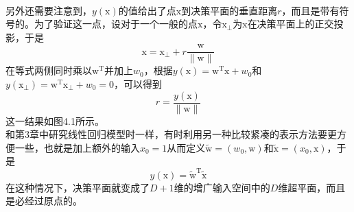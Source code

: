 \documentclass[b5paper]{book}
\numberwithin{equation}{chapter}
\newcommand {\bx} {\boldsymbol{\mathrm{x}}}
\newcommand {\bw} {\boldsymbol{\mathrm{w}}}
\newcommand {\rmT} {\mathrm{T}}
\begin{document}
{\begin{figure}[ht]
		\label{fig:4-1}
	\end{figure}
	\\
	\indent 另外还需要注意到，$y(\bx)$的值给出了点$\bx$到决策平面的垂直距离$r$，而且是带有符号的。为了验证这一点，设对于一个一般的点$\bx$，令$\bx_\bot$为$\bx$在决策平面上的正交投影，于是
	\begin{equation}
		\bx = \bx_\bot + r \frac{\bw}{\|\bw\|}
	\end{equation}
	在等式两侧同时乘以$\bw^{\rmT}$并加上$w_0$，根据$y(\bx)=\bw^{\rmT}\bx+w_0$和$y(\bx_\bot)=\bw^{\rmT}\bx_\bot + w_0 = 0$，可以得到
	\begin{equation}
		r = \frac{y(\bx)}{\|\bw\|}
	\end{equation}
	这一结果如图4.1所示。\\
	\indent 和第3章中研究线性回归模型时一样，有时利用另一种比较紧凑的表示方法要更方便一些，也就是加上额外的输入$x_0 = 1$从而定义$\widetilde{\bw} = (w_0,\bw)$和$\widetilde{\bx} = (x_0, \bx)$，于是
	\begin{equation}
		y(\bx) = \widetilde{\bw}^{\rmT} \widetilde{\bx}
	\end{equation}
	在这种情况下，决策平面就变成了$D+1$维的增广输入空间中的$D$维超平面，而且是必经过原点的。
	}
\end{document}
